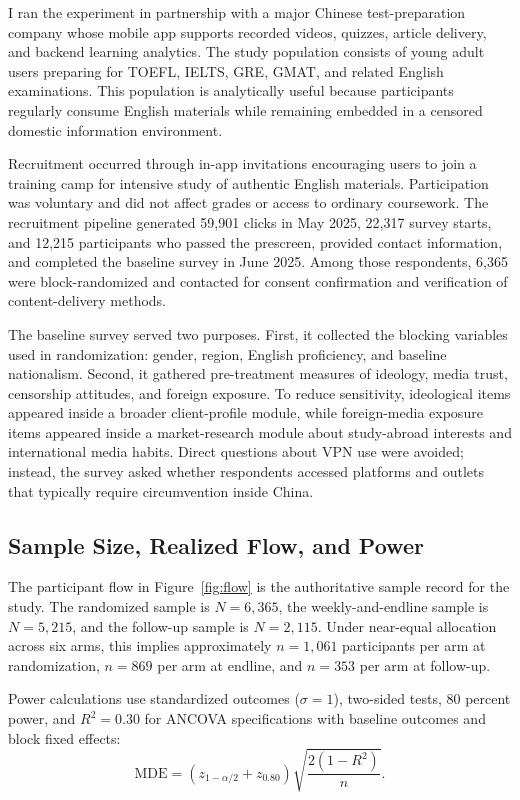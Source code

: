 \documentclass[12pt,american]{article}
\begin{document}
I ran the experiment in partnership with a major Chinese test-preparation company whose mobile app supports recorded videos, quizzes, article delivery, and backend learning analytics. The study population consists of young adult users preparing for TOEFL, IELTS, GRE, GMAT, and related English examinations. This population is analytically useful because participants regularly consume English materials while remaining embedded in a censored domestic information environment.

Recruitment occurred through in-app invitations encouraging users to join a training camp for intensive study of authentic English materials. Participation was voluntary and did not affect grades or access to ordinary coursework. The recruitment pipeline generated 59,901 clicks in May 2025, 22,317 survey starts, and 12,215 participants who passed the prescreen, provided contact information, and completed the baseline survey in June 2025. Among those respondents, 6,365 were block-randomized and contacted for consent confirmation and verification of content-delivery methods.

The baseline survey served two purposes. First, it collected the blocking variables used in randomization: gender, region, English proficiency, and baseline nationalism. Second, it gathered pre-treatment measures of ideology, media trust, censorship attitudes, and foreign exposure. To reduce sensitivity, ideological items appeared inside a broader client-profile module, while foreign-media exposure items appeared inside a market-research module about study-abroad interests and international media habits. Direct questions about VPN use were avoided; instead, the survey asked whether respondents accessed platforms and outlets that typically require circumvention inside China.

\subsection{Sample Size, Realized Flow, and Power}

The participant flow in Figure~\ref{fig:flow} is the authoritative sample record for the study. The randomized sample is \(N=6{,}365\), the weekly-and-endline sample is \(N=5{,}215\), and the follow-up sample is \(N=2{,}115\). Under near-equal allocation across six arms, this implies approximately \(n=1{,}061\) participants per arm at randomization, \(n=869\) per arm at endline, and \(n=353\) per arm at follow-up.

Power calculations use standardized outcomes (\(\sigma=1\)), two-sided tests, 80 percent power, and \(R^2=0.30\) for ANCOVA specifications with baseline outcomes and block fixed effects:
\[
\text{MDE}=
\left(z_{1-\alpha/2}+z_{0.80}\right)
\sqrt{\frac{2(1-R^2)}{n}}.
\]
\end{document}
